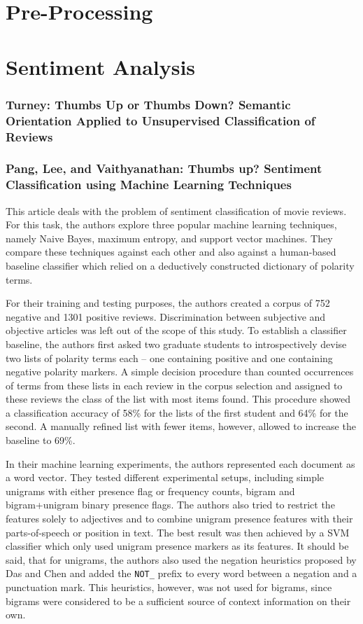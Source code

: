 \documentclass[a4paper,11pt]{article}
\begin{document}
\section{Pre-Processing}

\section{Sentiment Analysis}
\subsubsection{Turney: Thumbs Up or Thumbs Down? Semantic Orientation Applied to
               Unsupervised Classification of Reviews\cite{Turney-02}}

\subsubsection{Pang, Lee, and Vaithyanathan: Thumbs up? Sentiment Classification using Machine
                  Learning Techniques\cite{Pang-Lee-02}}

This article deals with the problem of sentiment classification of movie
reviews.  For this task, the authors explore three popular machine learning
techniques, namely Naive Bayes, maximum entropy, and support vector machines.
They compare these techniques against each other and also against a
human-based baseline classifier which relied on a deductively constructed
dictionary of polarity terms.

For their training and testing purposes, the authors created a corpus of 752
negative and 1301 positive reviews.  Discrimination between subjective and
objective articles was left out of the scope of this study.  To establish a
classifier baseline, the authors first asked two graduate students to
introspectively devise two lists of polarity terms each -- one containing
positive and one containing negative polarity markers.  A simple decision
procedure than counted occurrences of terms from these lists in each review in
the corpus selection and assigned to these reviews the class of the list with
most items found.  This procedure showed a classification accuracy of 58\% for
the lists of the first student and 64\% for the second.  A manually refined
list with fewer items, however, allowed to increase the baseline to 69\%.

In their machine learning experiments, the authors represented each document
as a word vector.  They tested different experimental setups, including simple
unigrams with either presence flag or frequency counts, bigram and
bigram+unigram binary presence flags.  The authors also tried to restrict the
features solely to adjectives and to combine unigram presence features with
their parts-of-speech or position in text.  The best result was then achieved
by a SVM classifier which only used unigram presence markers as its features.
It should be said, that for unigrams, the authors also used the negation
heuristics proposed by Das and Chen \cite{Das-Chen-01} and added the
\texttt{NOT\_} prefix to every word between a negation and a punctuation mark.
This heuristics, however, was not used for bigrams, since bigrams were
considered to be a sufficient source of context information on their own.
\end{document}
